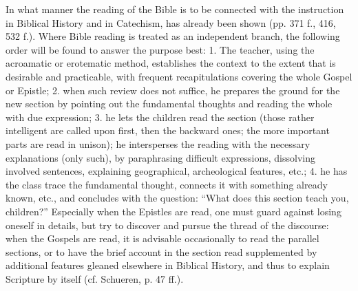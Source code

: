 In what manner the reading of the Bible is to be connected with the instruction in Biblical History and in Catechism, has already been shown (pp. 371 f., 416, 532 f.). Where Bible reading is treated as an independent branch, the following order will be found to answer the purpose best: 1. The teacher, using the acroamatic or erotematic method, establishes the context to the extent that is desirable and practicable, with frequent recapitulations covering the whole Gospel or Epistle; 2. when such review does not suffice, he prepares the ground for the new section by pointing out the fundamental thoughts and reading the whole with due expression; 3. he lets the children read the section (those rather intelligent are called upon first, then the backward ones; the more important parts are read in unison); he intersperses the reading with the necessary explanations (only such), by paraphrasing difficult expressions, dissolving involved sentences, explaining geographical, archeological features, etc.; 4. he has the class trace the fundamental thought, connects it with something already known, etc., and concludes with the question: “What does this section teach you, children?” Especially when the Epistles are read, one must guard against losing oneself in details, but try to discover and pursue the thread of the discourse: when the Gospels are read, it is advisable occasionally to read the parallel sections, or to have the brief account in the section read supplemented by additional features gleaned elsewhere in Biblical History, and thus to explain Scripture by itself (cf. Schueren, p. 47 ff.).

